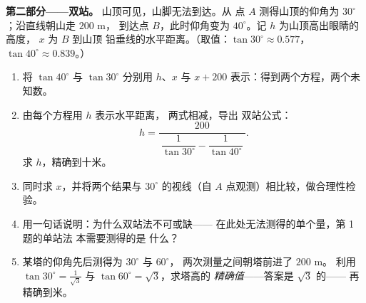 \begin{problem}
\medskip
\noindent\textbf{第二部分——双站。}
山顶可见，山脚无法到达。从
点 $A$ 测得山顶的仰角为 $30^\circ$；沿直线朝山走 $200$ m，
到达点 $B$，此时仰角变为
$40^\circ$。记 $h$ 为山顶高出眼睛的高度，
$x$ 为 $B$ 到山顶
铅垂线的水平距离。（取值：$\tan 30^\circ \approx 0.577$，
$\tan 40^\circ \approx 0.839$。）
\begin{enumerate}[resume]
  \item 将 $\tan 40^\circ$ 与 $\tan 30^\circ$ 分别用
        $h$、$x$ 与 $x + 200$ 表示：得到两个方程，两个未知数。
  \item 由每个方程用 $h$ 表示水平距离，
        两式相减，导出
        双站公式：
        \[
        h = \frac{200}
        {\ \dfrac{1}{\tan 30^\circ} - \dfrac{1}{\tan 40^\circ}\ } .
        \]
        求 $h$，精确到十米。
  \item 同时求 $x$，并将两个结果与
        $30^\circ$ 的视线（自 $A$ 点观测）相比较，做合理性检验。
  \item 用一句话说明：为什么双站法不可或缺——
        在此处无法测得的单个量，第 1 题的单站法
        本需要测得的是
        什么？
  \item 某塔的仰角先后测得为 $30^\circ$ 与 $60^\circ$，
        两次测量之间朝塔前进了 $200$ m。
        利用 $\tan 30^\circ = \frac{1}{\sqrt3}$ 与
        $\tan 60^\circ = \sqrt3$，求塔高的
        \emph{精确值}——答案是 $\sqrt3$ 的——
        再精确到米。
\end{enumerate}


\end{problem}
